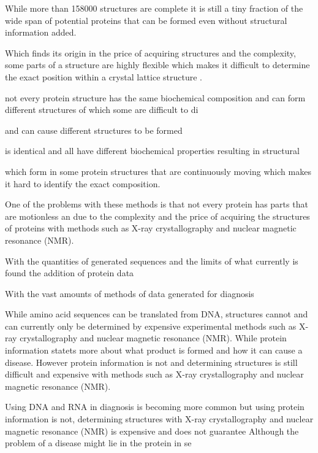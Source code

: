 While more than 158000 \cite{} structures are complete it is still a tiny fraction of the wide span of potential proteins \cite{} that can be formed even without structural information added. 

Which finds its origin in the price of acquiring structures and the complexity, some parts of a structure are highly flexible which makes it difficult to determine the exact position within a crystal lattice structure \cite{}.




 not every protein structure has the same biochemical composition and can form different structures of which some are difficult to di

and can cause different structures to be formed 

 is identical and all have different biochemical properties resulting in structural 

which form in some protein structures that are continuously moving which makes it hard to identify the exact composition. 

One of the problems with these methods is that not every protein has parts that are motionless an
 due to the complexity and the price of acquiring the structures of proteins with methods such as X-ray crystallography and nuclear magnetic resonance (NMR).

With the quantities of generated sequences and the limits of what currently is found the addition of protein data 

With the vast amounts of methods of data generated for diagnosis 

While amino acid sequences can be translated from DNA, structures cannot and can currently only be determined by expensive experimental methods such as X-ray crystallography and nuclear magnetic resonance (NMR).
While protein information statets more about what product is formed and how it can cause a disease.
However protein information is not and determining structures is still difficult and expensive with methods such as X-ray crystallography and nuclear magnetic resonance (NMR).


Using DNA and RNA in diagnosis is becoming more common but using protein information is not, determining structures with X-ray crystallography and nuclear magnetic resonance (NMR) is expensive and does not guarantee
Although the problem of a disease might lie in the protein in se

